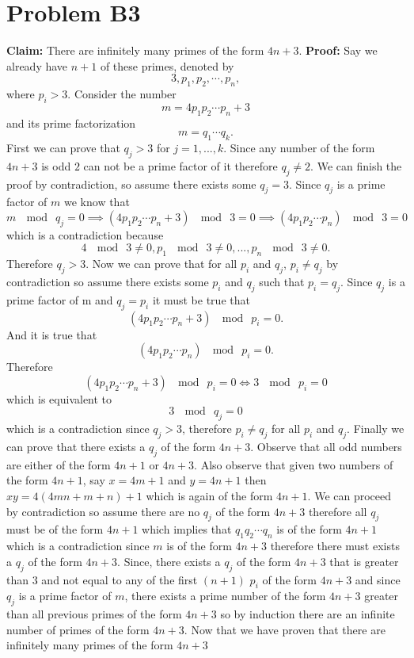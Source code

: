 \documentclass[12pt]{article}
\begin{document}
\section*{Problem B3}
\textbf{Claim:} There are infinitely many primes of the form $4n+3$.
\newline
\textbf{Proof:} Say we already have $n+1$ of these primes, denoted by
$$3, p_1, p_2, \cdots, p_n,$$
where $p_i > 3$. Consider the number
$$m = 4p_1p_2 \cdots p_n + 3$$
and its prime factorization
$$m=q_1 \cdots q_k.$$
First we can prove that $q_j > 3$ for $j = 1,...,k$. Since any number of the
form $4n+3$ is odd $2$ can not be a prime factor of it therefore $q_j \neq 2$.
We can finish the proof by
contradiction, so assume there exists some $q_j = 3$. Since $q_j$ is a prime
factor of $m$ we know that
$$m\ \mod\ q_j = 0 \implies (4p_1p_2 \cdots p_n + 3)\ \mod\ 3 = 0
\implies (4p_1p_2 \cdots p_n)\ \mod\ 3 = 0$$
which is a contradiction because
$$4\ \mod\ 3 \neq 0,p_1\ \mod\ 3 \neq 0,...,p_n\ \mod\ 3 \neq 0.$$
Therefore $q_j > 3$. Now we can prove that for all $p_i$ and $ q_j$,
$p_i \neq q_j$ by contradiction so assume there exists some $p_i$ and $q_j$ such
that $p_i = q_j$. Since $q_j$ is a prime factor of m and $q_j = p_i$ it must be
true that
$$(4p_1p_2 \cdots p_n + 3)\ \mod\ p_i = 0.$$
And it is true that
$$(4p_1p_2 \cdots p_n)\ \mod\ p_i = 0.$$
Therefore
$$(4p_1p_2 \cdots p_n + 3)\ \mod\ p_i = 0 \iff 3\ \mod\ p_i = 0$$
which is equivalent to
$$3\ \mod\ q_j = 0$$
which is a contradiction since $q_j > 3$, therefore $p_i \neq q_j$ for all $p_i$
and $q_j$. Finally we can prove that there exists a $q_j$ of the form $4n+3$.
Observe that all odd numbers are either of the form $4n+1$ or $4n+3$. Also
observe that given two numbers of the form $4n+1$, say $x = 4m+1$ and
$y = 4n+1$ then $xy = 4(4mn + m + n) + 1$ which is again of the form $4n+1$.
We can proceed by contradiction so assume there are no $q_j$ of the form
$4n+3$ therefore all $q_j$ must be of the form $4n+1$ which implies that
$q_1q_2\cdots q_n$ is of the form $4n+1$ which is a contradiction since $m$ is
of the form $4n+3$ therefore there must exists a $q_j$ of the form $4n+3$.
Since, there exists a $q_j$ of the form $4n+3$ that is greater than $3$ and not
equal to any of the first $(n+1)$ $p_i$ of the form $4n+3$ and since $q_j$ is a
prime factor of $m$, there exists a prime number of the form $4n+3$ greater than
all previous primes of the form $4n+3$ so by induction there are an infinite
number of primes of the form $4n+3$.
\medskip
\newline
Now that we have proven that there are infinitely many primes of the form $4n+3$
\end{document}
